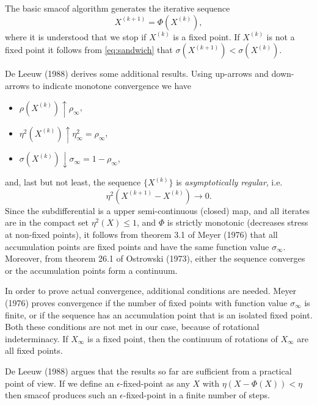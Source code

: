 \documentclass[
  12pt,
]{article}
\providecommand{\tightlist}{%
  \setlength{\itemsep}{0pt}\setlength{\parskip}{0pt}}
\begin{document}
The basic smacof algorithm generates the iterative sequence
\begin{equation}
X^{(k+1)}=\Phi(X^{(k)}),
\label{eq:basic}
\end{equation}
where it is understood that we stop if \(X^{(k)}\) is a fixed point. If
\(X^{(k)}\) is not a fixed point it follows from \eqref{eq:sandwich} that \(\sigma(X^{(k+1)})<\sigma(X^{(k)})\).

De Leeuw (1988) derives some additional results. Using up-arrows and down-arrows
to indicate monotone convergence we have

\begin{itemize}
\tightlist
\item
  \(\rho(X^{(k)})\uparrow\rho_\infty\),
\item
  \(\eta^2(X^{(k)})\uparrow\eta^2_\infty=\rho_\infty\),
\item
  \(\sigma(X^{(k)})\downarrow\sigma_\infty=1-\rho_\infty\),
\end{itemize}

and, last but not least, the sequence \(\{X^{(k)}\}\) is \emph{asymptotically regular}, i.e.
\begin{equation}
\eta^2(X^{(k+1)}-X^{(k)})\rightarrow 0.
\label{eq:etaconv}
\end{equation}
Since the subdifferential is a upper semi-continuous (closed) map, and all iterates
are in the compact set \(\eta^2(X)\leq 1\), and \(\Phi\) is strictly monotonic
(decreases stress at non-fixed points), it follows from theorem 3.1 of Meyer (1976) that
all accumulation points are fixed points and have the same function value \(\sigma_\infty\). Moreover, from theorem 26.1 of Ostrowski (1973), either the sequence
converges or the accumulation points form a continuum.

In order to prove actual convergence, additional conditions are needed.
Meyer (1976) proves convergence if the number of fixed points with function value \(\sigma_\infty\) is finite, or if the sequence has an accumulation point that is an isolated fixed point. Both these conditions are not met in our case, because
of rotational indeterminacy. If \(X_\infty\) is a fixed point, then the
continuum of rotations of \(X_\infty\) are all fixed points.

De Leeuw (1988) argues that the results so far are sufficient from a
practical point of view. If we define an \(\epsilon\)-fixed-point as
any \(X\) with \(\eta(X-\Phi(X))<\eta\) then smacof produces such an
\(\epsilon\)-fixed-point in a finite number of steps.
\end{document}
